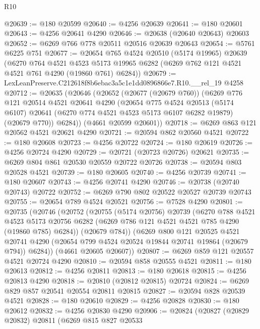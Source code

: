 \begin{lexlean}{R10}
\begin{coremodule}
@20639 := @180 @20599
@20640 := @4256 @20639
@20641 := @180 @20601
@20643 := @4256 @20641 @4290
@20646 := @20638 (@20640 @20643) @20603
@20652 := @6269 @766 @778 @20511 @20516 @20639 @20643
@20654 := @5761 @6225 @751
@20677 := @20654
    @765
    @4524
    @20510
    (@5174 @19965)
    @20639
    (@6270
      @764
      @4521
      @4523
      @5173
      @19965
      @6282
      (@6269 @762 @121 @4521 @4521 @761 @4290 (@19860 @761) @6284))
@20679 := LexLeanPreserve.C212618f8b6ebac3a5c1e1dd0896866e7.R10.__rel_19 @4258
@20712 := @20635
    (@20646
      (@20652
        (@20677 (@20679 @760))
        (@6269
          @776
          @121
          @20514
          @4521
          @20641
          @4290
          (@20654
            @775
            @4524
            @20513
            (@5174 @6107)
            @20641
            (@6270 @774 @4521 @4523 @5173 @6107 @6282 @19879)
            (@20679 @770))
          @6284))
      (@4661 @20599 @20601))
@20718 := @6269 @863 @121 @20562 @4521 @20621 @4290
@20721 := @20594 @862 @20560 @4521
@20722 := @180 @20608
@20723 := @4256 @20722
@20724 := @180 @20619
@20726 := @4256 @20724 @4290
@20729 := @20721 (@20723 @20726) @20621
@20735 := @6269 @804 @861 @20530 @20559 @20722 @20726
@20738 := @20594 @803 @20528 @4521
@20739 := @180 @20605
@20740 := @4256 @20739
@20741 := @180 @20607
@20743 := @4256 @20741 @4290
@20746 := @20738 (@20740 @20743) @20722
@20752 := @6269 @790 @802 @20522 @20527 @20739 @20743
@20755 := @20654 @789 @4524 @20521
@20756 := @7528 @4290
@20801 := @20735
    (@20746
      (@20752
        (@20755
          (@5174 @20756)
          @20739
          (@6270
            @788
            @4521
            @4523
            @5173
            @20756
            @6282
            (@6269 @786 @121 @4521 @4521 @785 @4290 (@19860 @785) @6284))
          (@20679 @784))
        (@6269
          @800
          @121
          @20525
          @4521
          @20741
          @4290
          (@20654 @799 @4524 @20524 @19844 @20741 @19864 (@20679 @794))
          @6284))
      (@4661 @20605 @20607))
@20807 := @6269 @859 @121 @20557 @4521 @20724 @4290
@20810 := @20594 @858 @20555 @4521
@20811 := @180 @20613
@20812 := @4256 @20811
@20813 := @180 @20618
@20815 := @4256 @20813 @4290
@20818 := @20810 (@20812 @20815) @20724
@20824 := @6269 @829 @857 @20541 @20554 @20811 @20815
@20827 := @20594 @828 @20539 @4521
@20828 := @180 @20610
@20829 := @4256 @20828
@20830 := @180 @20612
@20832 := @4256 @20830 @4290
@20906 := @20824
    (@20827
      (@20829 @20832)
      @20811
      (@6269
        @815
        @827
        @20533

\end{coremodule}
\end{lexlean}
